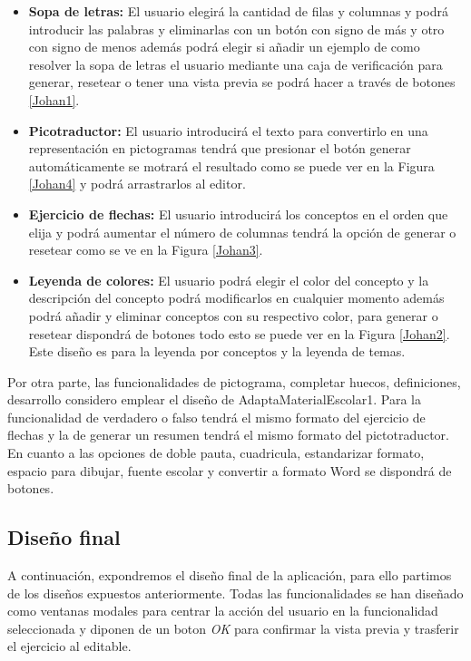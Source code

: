 \begin{itemize}
  \item \textbf{Sopa de letras:} El usuario elegirá la cantidad de filas y columnas y podrá introducir las palabras y eliminarlas con un botón con signo de más y otro con signo de menos además podrá elegir si añadir un ejemplo de como resolver la sopa de letras el usuario mediante una caja de verificación para generar, resetear o tener una vista previa se podrá hacer a través de botones \ref{Johan1}.
  \item \textbf{Picotraductor:} El usuario introducirá el texto para convertirlo en una representación en pictogramas tendrá que presionar el botón generar automáticamente se motrará el resultado como se puede ver en la Figura \ref{Johan4} y podrá arrastrarlos al editor.
  \item \textbf{Ejercicio de flechas:} El usuario introducirá los conceptos en el orden que elija y podrá aumentar el número de columnas tendrá la opción de generar o resetear como se ve en la Figura \ref{Johan3}.
  \item  \textbf{Leyenda de colores:} El usuario podrá elegir el color del concepto y la descripción del concepto podrá modificarlos en cualquier momento además podrá añadir y eliminar conceptos con su respectivo color, para generar o resetear dispondrá de botones todo esto se puede ver en la Figura \ref{Johan2}. Este diseño es para la leyenda por conceptos y la leyenda de temas.
\end{itemize}
Por otra parte, las funcionalidades de pictograma, completar huecos, definiciones, desarrollo considero emplear el diseño de AdaptaMaterialEscolar1. Para la funcionalidad de verdadero o falso tendrá el mismo formato del ejercicio de flechas y la de generar un resumen tendrá el mismo formato del pictotraductor. En cuanto a las opciones de doble pauta, cuadricula, estandarizar formato, espacio para dibujar, fuente escolar y convertir a formato Word se dispondrá de botones.


\subsection{Diseño final}
A continuación, expondremos el diseño final de la aplicación, para ello partimos de los diseños expuestos anteriormente. Todas las funcionalidades se han diseñado como ventanas modales para centrar la acción del usuario en la funcionalidad seleccionada y diponen de un boton \textit{OK} para confirmar la vista previa y trasferir el ejercicio al editable.
